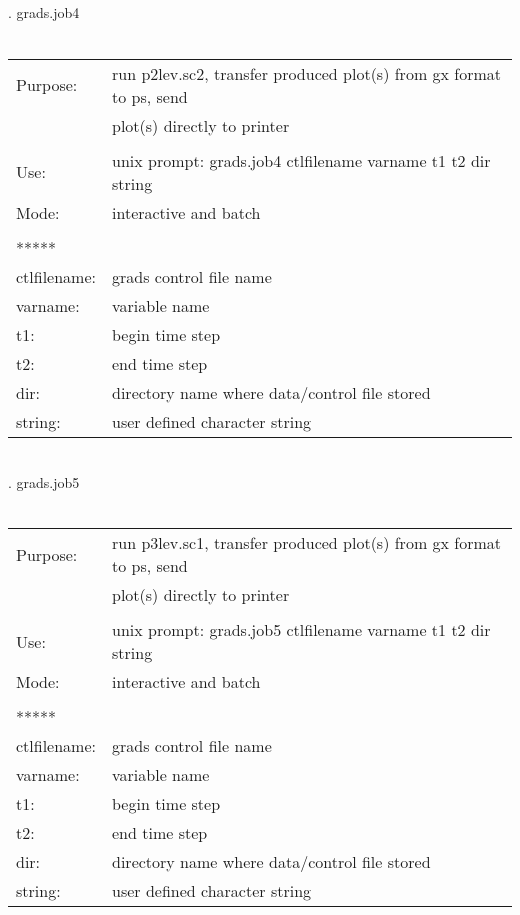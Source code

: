\\
\\
\\
\\ 
. grads.job4 \\ \\
\begin{tabular}{ll}
Purpose:     &  run p2lev.sc2, transfer produced plot(s) from gx format to ps, send \\
             &  plot(s) directly to printer  \\
\\
Use:         &  unix prompt: grads.job4 ctlfilename varname t1 t2 dir  string     \\
Mode:        &  interactive and batch        \\ 
\\
*****  \\
ctlfilename: &  grads control file name     \\
varname:     &  variable name     \\
t1:       &  begin time step    \\
t2:       &  end time step    \\
dir:      &  directory name where data/control file stored  \\
string:   &  user defined character string  
\end{tabular}
\\
\newpage 
{}. grads.job5 \\ \\
\begin{tabular}{ll}
Purpose:     &  run p3lev.sc1, transfer produced plot(s) from gx format to ps, send \\
             &  plot(s) directly to printer  \\
\\
Use:         &  unix prompt: grads.job5 ctlfilename varname t1 t2 dir  string     \\
Mode:        &  interactive and batch        \\ 
\\
*****  \\
ctlfilename: &  grads control file name     \\
varname:     &  variable name     \\
t1:       &  begin time step    \\
t2:       &  end time step    \\
dir:      &  directory name where data/control file stored  \\
string:   &  user defined character string  
\end{tabular}
